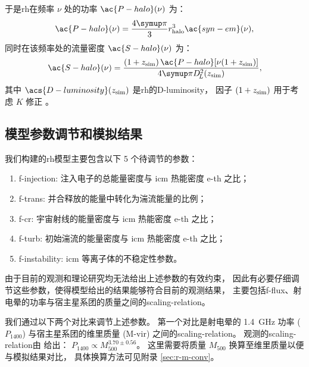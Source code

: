 于是\ac{rh}在频率 $\nu$ 处的功率 $\ac{P-halo}(\nu)$ 为：
\begin{equation}
  \label{eq:halo-power}
  \ac{P-halo}(\nu) = \frac{4\Cpi}{3} r_{\R{halo}}^3 \ac{syn-em}(\nu) ,
\end{equation}
同时在该频率处的流量密度 $\ac{S-halo}(\nu)$ 为：
\begin{equation}
  \label{eq:halo-flux}
  \ac{S-halo}(\nu) =
    \frac{(1+z_{\R{sim}}) \,\ac{P-halo}[\nu(1+z_{\R{sim}})]}{
      4\Cpi D_{\!L}^2(z_{\R{sim}})} ,
\end{equation}
其中
$\acs{D-luminosity}(z_{\R{sim}})$ 是\ac{rh}的\acl{D-luminosity}，
因子 $(1 + z_{\mathrm{sim}})$ 用于考虑 $K$ 修正 \cite{hogg1999}。

\subsection{模型参数调节和模拟结果}
\label{sec:halo-results}

我们构建的\ac{rh}模型主要包含以下 5 个待调节的参数：
\begin{enumerate}
  \item \ac{f-injection}:
    注入电子的总能量密度与 \ac{icm} 热能密度 \ac{e-th} 之比；
  \item \ac{f-trans}:
    并合释放的能量中转化为湍流能量的比例；
  \item \ac{f-cr}:
    宇宙射线的能量密度与 \ac{icm} 热能密度 \ac{e-th} 之比；
  \item \ac{f-turb}:
    初始湍流的能量密度与 \ac{icm} 热能密度 \ac{e-th} 之比；
  \item \ac{f-instability}:
    \ac{icm} 等离子体的不稳定性参数。
\end{enumerate}
由于目前的观测和理论研究均无法给出上述参数的有效约束，
因此有必要仔细调节这些参数，使得模型给出的结果能够符合目前的观测结果，
主要包括\ac{f-flux}、射电晕的功率与宿主星系团的质量之间的\ac{scaling-relation}。

我们通过以下两个对比来调节上述参数。
第一个对比是射电晕的 \SI{1.4}{\GHz} 功率 ($P_{1400}$)
与宿主星系团的维里质量 (\ac{M-vir}) 之间的\ac{scaling-relation}。
观测的\ac{scaling-relation}由  给出：
$P_{1400} \propto M_{500}^{3.70 \pm 0.56}$。
这里需要将质量 $M_{500}$ 换算至维里质量以便与模拟结果对比，
具体换算方法可见附录 \autoref{sec:r-m-conv}。

